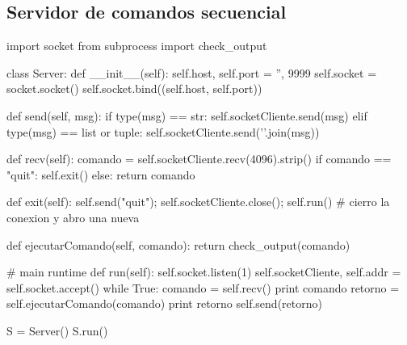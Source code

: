 \documentclass[12pt,a4paper,titlepage]{article}
\begin{document}
    \subsection{Servidor de comandos secuencial}
    \begin{python}
    import socket
    from subprocess import check_output

    class Server:
        def __init__(self):
        	self.host, self.port = '', 9999
        	self.socket = socket.socket()
        	self.socket.bind((self.host, self.port))
    
        def send(self, msg):
        	if type(msg) == str: self.socketCliente.send(msg)
        	elif type(msg) == list or tuple: self.socketCliente.send('\n'.join(msg))
    
        def recv(self):
        	comando = self.socketCliente.recv(4096).strip()
            if comando == "quit":
                self.exit()
            else: return comando
    
        def exit(self):
           self.send("quit");
           self.socketCliente.close(); self.run()
        	# cierro la conexion y abro una nueva
        
        def ejecutarComando(self, comando):
            return check_output(comando)    
    
        # main runtime
        def run(self):
            self.socket.listen(1)
        	self.socketCliente, self.addr = self.socket.accept()
        	while True:
                comando = self.recv()
                print comando
                retorno = self.ejecutarComando(comando)
                print retorno
                self.send(retorno)
    
    
    S = Server()
    S.run()
    \end{python}
    
\end{document}
